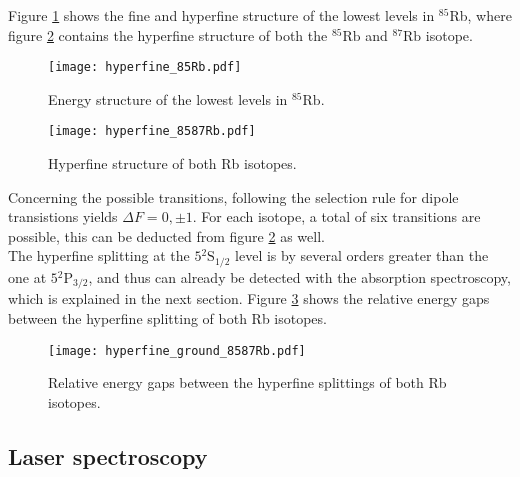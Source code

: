 Figure \ref{fig:hyperfine_85Rb} shows the fine and hyperfine structure of the lowest levels in $^{85}$Rb, where figure \ref{fig:hyperfine_8587Rb} contains the hyperfine structure of both the $^{85}\text{Rb}$ and $^{87}\text{Rb}$ isotope.
\begin{figure}[h]
	\centering
	\texttt{[image: hyperfine\_85Rb.pdf]}
	\caption{Energy structure of the lowest levels in $^{85}\text{Rb}$. \cite{lit:SAS}}
	\label{fig:hyperfine_85Rb}
\end{figure}
\begin{figure}[h]
	\centering
	\texttt{[image: hyperfine\_8587Rb.pdf]}
	\caption{Hyperfine structure of both Rb isotopes. \cite{lit:AK_manual2012}}
	\label{fig:hyperfine_8587Rb}
\end{figure}
Concerning the possible transitions, following the selection rule for dipole transistions yields $\Delta F=0,\pm 1$. For each isotope, a total of six transitions are possible, this can be deducted from figure \ref{fig:hyperfine_8587Rb} as well.\\
The hyperfine splitting at the $5{}^2\mathrm{S}_{1/2}$ level is by several orders greater than the one at $5{}^2\mathrm{P}_{3/2}$, and thus can already be detected with the absorption spectroscopy, which is explained in the next section. Figure \ref{fig:hyperfine_ground_8587Rb} shows the relative energy gaps between the hyperfine splitting of both Rb isotopes.
\begin{figure}[h]
	\centering
	\texttt{[image: hyperfine\_ground\_8587Rb.pdf]}
	\caption[Energy gaps in hyperfine structure]{Relative energy gaps between the hyperfine splittings of both Rb isotopes. \cite{lit:AK_manual2012}}
	\label{fig:hyperfine_ground_8587Rb}
\end{figure}
\subsection{Laser spectroscopy}
